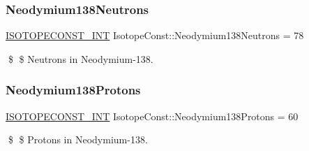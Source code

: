 \subsubsection{\texorpdfstring{Neodymium138\+Neutrons}{Neodymium138Neutrons}}
{\footnotesize\ttfamily \mbox{\hyperlink{group___isotope_const-_macros_ga5f18360b3e99483a35c32d789e62621c}{I\+S\+O\+T\+O\+P\+E\+C\+O\+N\+S\+T\+\_\+\+I\+NT}} Isotope\+Const\+::\+Neodymium138\+Neutrons = 78}

\$ \$ Neutrons in Neodymium-\/138. \mbox{\label{group___isotope_const-_neodymium-_nd138_ga68b85557cd18517c9e52c9b9fc65f780}} 
\subsubsection{\texorpdfstring{Neodymium138\+Protons}{Neodymium138Protons}}
{\footnotesize\ttfamily \mbox{\hyperlink{group___isotope_const-_macros_ga5f18360b3e99483a35c32d789e62621c}{I\+S\+O\+T\+O\+P\+E\+C\+O\+N\+S\+T\+\_\+\+I\+NT}} Isotope\+Const\+::\+Neodymium138\+Protons = 60}

\$ \$ Protons in Neodymium-\/138. 
